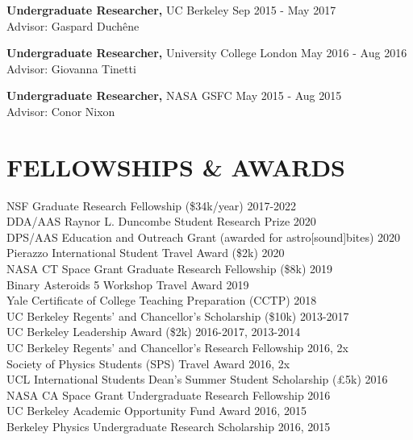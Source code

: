\documentclass[margin]{res}
\begin{document}
\begin{resume}
\textbf{Undergraduate Researcher,} UC Berkeley \hfill Sep 2015 - May 2017 \\
\hspace{5mm} Advisor: Gaspard Duch\^{e}ne 

\textbf{Undergraduate Researcher,} University College London \hfill May 2016 - Aug 2016
\\
\hspace{5mm} Advisor: Giovanna Tinetti 

\textbf{Undergraduate Researcher,} NASA GSFC \hfill May 2015 - Aug 2015 \\
\hspace{5mm} Advisor: Conor Nixon


\section{\normalfont FELLOWSHIPS \& AWARDS}
\textbullet{} NSF Graduate Research Fellowship (\$34k/year) \hfill 2017-2022\\
\textbullet{} DDA/AAS Raynor L. Duncombe Student Research Prize \hfill 2020\\
\textbullet{} DPS/AAS Education and Outreach Grant (awarded for astro[sound]bites) \hfill 2020\\
\textbullet{} Pierazzo International Student Travel Award (\$2k) \hfill 2020\\
\textbullet{} NASA CT Space Grant Graduate Research Fellowship (\$8k) \hfill 2019\\
\textbullet{} Binary Asteroids 5 Workshop Travel Award \hfill 2019\\
\textbullet{} Yale Certificate of College Teaching Preparation (CCTP) \hfill 2018\\
\textbullet{} UC Berkeley Regents' and Chancellor's Scholarship (\$10k) \hfill 2013-2017\\
\textbullet{} UC Berkeley Leadership Award (\$2k) \hfill 2016-2017, 2013-2014\\
\textbullet{} UC Berkeley Regents' and Chancellor's Research Fellowship \hfill 2016, 2x\\
\textbullet{} Society of Physics Students (SPS) Travel Award \hfill 2016, 2x\\
\textbullet{} UCL International Students Dean's Summer Student Scholarship (\pounds5k) \hfill 2016\\
\textbullet{} NASA CA Space Grant Undergraduate Research Fellowship \hfill 2016\\
\textbullet{} UC Berkeley Academic Opportunity Fund Award \hfill 2016, 2015\\
\textbullet{} Berkeley Physics Undergraduate Research Scholarship \hfill 2016, 2015\\



\end{resume}
\end{document}
